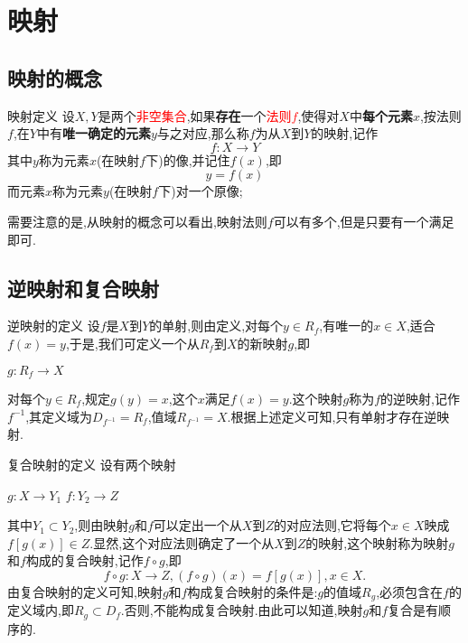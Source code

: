 \section{映射}
\subsection{映射的概念}
\begin{defn}{映射定义}{}
    设$X,Y$是两个\textcolor{red}{非空集合},如果\textbf{存在}一个\textcolor{red}{法则$f$},使得对$X$中\textbf{每个元素}$x$,按法则$f$,在$Y$中有\textbf{唯一确定的元素}$y$与之对应,那么称$f$为从$X$到$Y$的映射,记作
    $$
        f:X \to Y
    $$
    其中$y$称为元素$x$(在映射$f$下)的像,并记住$f(x)$,即
    $$
        y=f(x)
    $$
    而元素$x$称为元素$y$(在映射$f$下)对一个原像;
\end{defn}
需要注意的是,从映射的概念可以看出,映射法则$f$可以有多个,但是只要有一个满足即可.
\subsection{逆映射和复合映射}
\begin{defn}{逆映射的定义}{}
    设$f$是$X$到$Y$的单射,则由定义,对每个$y \in R_f$,有唯一的$x \in X$,适合$f(x)=y$,于是,我们可定义一个从$R_f$到$X$的新映射$g$,即
    \begin{center}
        $g: R_f \to X$
    \end{center}
    对每个$y \in R_f$,规定$g(y)=x$,这个$x$满足$f(x)=y$.这个映射$g$称为$f$的逆映射,记作$f^{-1}$,其定义域为$D_{f^{-1}}=R_f$,值域$R_{f^{-1}}=X$.根据上述定义可知,只有单射才存在逆映射.
\end{defn}
\begin{defn}{复合映射的定义}{}
    设有两个映射
    \begin{center}
        $g: X \to Y_1$ \qquad $f:Y_2 \to Z$
    \end{center}
    其中$Y_1 \subset Y_2$,则由映射$g$和$f$可以定出一个从$X$到$Z$的对应法则,它将每个$x \in X$映成$f[g(x)] \in Z$.显然,这个对应法则确定了一个从$X$到$Z$的映射,这个映射称为映射$g$和$f$构成的复合映射,记作$f \circ g$,即
    $$
        f\circ g:X\to Z,(f\circ g)(x)=f[g(x)],x\in X.
    $$
    由复合映射的定义可知,映射$g$和$f$构成复合映射的条件是:$g$的值域$R_g$,必须包含在$f$的定义域内,即$R_g \subset D_f$.否则,不能构成复合映射.由此可以知道,映射$g$和$f$复合是有顺序的.
\end{defn}
